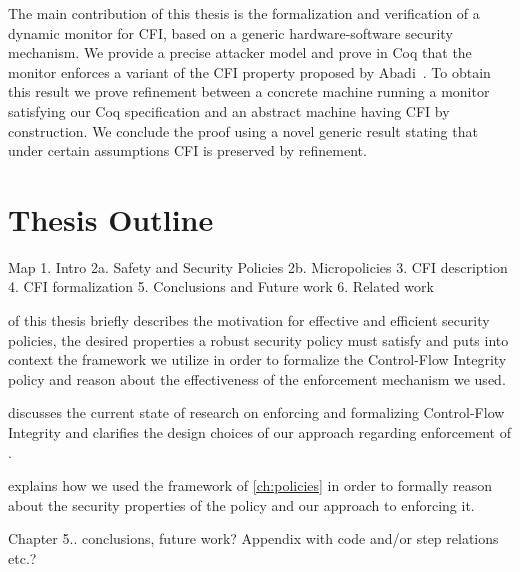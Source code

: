 The main contribution of this thesis is the formalization and
verification of a dynamic monitor for CFI, based on a generic
hardware-software security mechanism.
%
We provide a precise attacker model and prove in Coq that the monitor
enforces a variant of the CFI property proposed by
Abadi~\ETAL\cite{AbadiBEL09}.
%
To obtain this result we prove refinement between a concrete
machine running a monitor satisfying our Coq specification
and an abstract machine having CFI by construction.
%
We conclude the proof using a novel generic result stating that under
certain assumptions CFI is preserved by refinement.

\section{Thesis Outline}\label{sec:outline}
Map
1. Intro
2a. Safety and Security Policies
2b. Micropolicies
3. CFI description
4. CFI formalization
5. Conclusions and Future work
6. Related work

 of this thesis briefly describes the motivation for
effective and efficient security policies, the desired properties a
robust security policy must satisfy and puts into context the
framework we utilize in order to formalize the Control-Flow Integrity policy
and reason about the effectiveness of the enforcement mechanism we used.

 discusses the current state of
research on enforcing and formalizing Control-Flow Integrity and clarifies
the design choices of our approach regarding enforcement of \CFI.

 explains how we used the framework of \cref{ch:policies}
in order to formally reason about the security properties of the \CFI policy and
our approach to enforcing it. 

Chapter 5.. conclusions, future work? Appendix with code and/or step
relations etc.?
